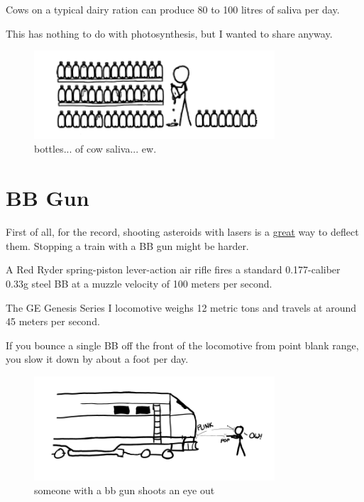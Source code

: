 {Cows on a typical dairy ration can produce 80 to 100 litres of saliva per day.}

{This has nothing to do with photosynthesis, but I wanted to share anyway.}

\begin{figure}[!htbp]
\centering
\includegraphics[scale=0.5, max width=0.8\textwidth]{imgs/a/17/04.png}
\caption{bottles... of cow saliva... ew.}
\end{figure}

{
\chapter{BB Gun}
}

\hfill{}

{First of all, for the record, shooting asteroids with lasers is a \href{http://proceedings.aip.org/resource/2/apcpcs/664/1/509\_1?bypassSSO=1}{great} way to deflect them. Stopping a train with a BB gun might be harder.}

{A Red Ryder spring-piston lever-action air rifle fires a standard 0.177-caliber 0.33g steel BB at a muzzle velocity of 100 meters per second.}

{The GE Genesis Series I locomotive weighs 12 metric tons and travels at around 45 meters per second.}

{If you bounce a single BB off the front of the locomotive from point blank range, you slow it down by about a foot per day.}

\begin{figure}[!htbp]
\centering
\includegraphics[scale=0.5, max width=0.8\textwidth]{imgs/a/18/bb_1shot.png}
\caption{someone with a bb gun shoots an eye out}
\end{figure}

